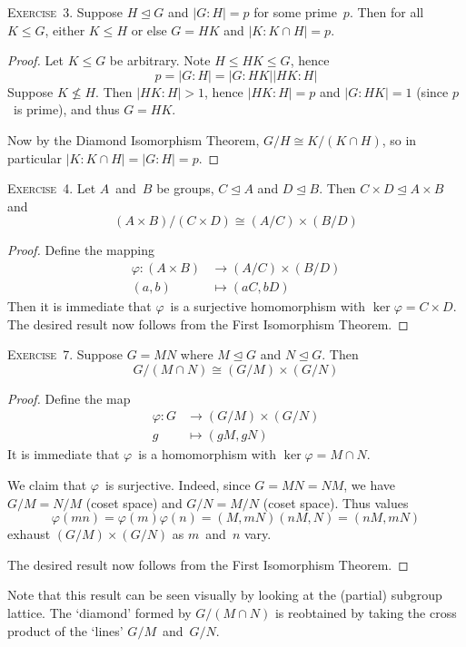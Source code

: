 \documentclass[letterpaper]{article}
\newcommand{\exercise}[1]{\goodbreak\noindent\textsc{Exercise~{#1}.}}
\newcommand{\iso}{\cong}
\newcommand{\sect}{\cap}
\newcommand{\subgroup}{\le}
\newcommand{\normal}{\trianglelefteq}
\newcommand{\gindex}[2]{|{#1}:{#2}|}
\begin{document}
\exercise{3}
Suppose $H\normal G$ and $\gindex{G}{H}=p$ for some prime~$p$. Then for all $K\subgroup G$, either $K\subgroup H$ or else $G=HK$ and $\gindex{K}{K\sect H}=p$.
\begin{proof}
Let $K\subgroup G$ be arbitrary. Note $H\subgroup HK\subgroup G$, hence
$$p=\gindex{G}{H}=\gindex{G}{HK}\gindex{HK}{H}$$
Suppose $K\not\subgroup H$. Then $\gindex{HK}{H}>1$, hence $\gindex{HK}{H}=p$ and $\gindex{G}{HK}=1$ (since $p$~is prime), and thus $G=HK$.

Now by the Diamond Isomorphism Theorem, $G/H\iso K/(K\sect H)$, so in particular $\gindex{K}{K\sect H}=\gindex{G}{H}=p$.
\end{proof}

\exercise{4}
Let $A$~and~$B$ be groups, $C\normal A$ and $D\normal B$. Then $C\times D\normal A\times B$ and
$$(A\times B)/(C\times D)\iso(A/C)\times(B/D)$$
\begin{proof}
Define the mapping
\begin{align*}
\varphi:(A\times B)&\to(A/C)\times(B/D)\\
		(a,b)&\mapsto(aC,bD)
\end{align*}
Then it is immediate that $\varphi$~is a surjective homomorphism with $\ker\varphi=C\times D$. The desired result now follows from the First Isomorphism Theorem.
\end{proof}

\exercise{7}
Suppose $G=MN$ where $M\normal G$ and $N\normal G$. Then
$$G/(M\sect N)\iso(G/M)\times(G/N)$$
\begin{proof}
Define the map
\begin{align*}
\varphi:G&\to(G/M)\times(G/N)\\
		g&\mapsto(gM,gN)
\end{align*}
It is immediate that $\varphi$~is a homomorphism with $\ker\varphi=M\sect N$.

We claim that $\varphi$~is surjective. Indeed, since $G=MN=NM$, we have $G/M=N/M$ (coset space) and $G/N=M/N$ (coset space). Thus values
$$\varphi(mn)=\varphi(m)\varphi(n)=(M,mN)(nM,N)=(nM,mN)$$
exhaust $(G/M)\times(G/N)$ as $m$~and~$n$ vary.

The desired result now follows from the First Isomorphism Theorem.
\end{proof}
\noindent Note that this result can be seen visually by looking at the (partial) subgroup lattice. The `diamond' formed by $G/(M\sect N)$ is reobtained by taking the cross product of the `lines' $G/M$~and~$G/N$.
\end{document}
